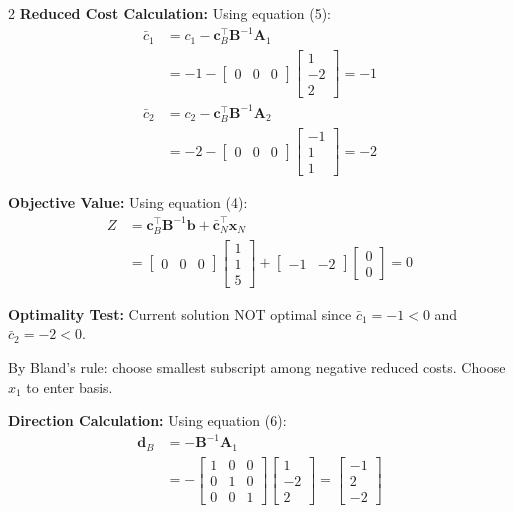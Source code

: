 \documentclass[10pt,a4paper]{article}
\newcommand{\mysubsection}[1]{\vspace{2pt}\textbf{#1:}\vspace{1pt}}
\newcommand{\mb}[1]{\mathbf{#1}}
\begin{document}
\begin{multicols}{2}
\mysubsection{Reduced Cost Calculation}
Using equation (5):
\begin{align*}
\bar{c}_1 &= c_1 - \mb{c}_B^\top\mb{B}^{-1}\mb{A}_1 \\
&= -1 - \begin{bmatrix} 0 & 0 & 0 \end{bmatrix} \begin{bmatrix} 1 \\ -2 \\ 2 \end{bmatrix} = -1 \\
\bar{c}_2 &= c_2 - \mb{c}_B^\top\mb{B}^{-1}\mb{A}_2 \\
&= -2 - \begin{bmatrix} 0 & 0 & 0 \end{bmatrix} \begin{bmatrix} -1 \\ 1 \\ 1 \end{bmatrix} = -2
\end{align*}

\mysubsection{Objective Value}
Using equation (4):
\begin{align*}
Z &= \mb{c}_B^\top\mb{B}^{-1}\mb{b} + \bar{\mb{c}}_N^\top\mb{x}_N \\
&= \begin{bmatrix} 0 & 0 & 0 \end{bmatrix} \begin{bmatrix} 1 \\ 1 \\ 5 \end{bmatrix} + \begin{bmatrix} -1 & -2 \end{bmatrix} \begin{bmatrix} 0 \\ 0 \end{bmatrix} = 0
\end{align*}

\mysubsection{Optimality Test}
Current solution NOT optimal since $\bar{c}_1 = -1 < 0$ and $\bar{c}_2 = -2 < 0$.

By Bland's rule: choose smallest subscript among negative reduced costs. Choose $x_1$ to enter basis.

\mysubsection{Direction Calculation}
Using equation (6):
\begin{align*}
\mb{d}_B &= -\mb{B}^{-1}\mb{A}_1 \\
&= -\begin{bmatrix} 1 & 0 & 0 \\ 0 & 1 & 0 \\ 0 & 0 & 1 \end{bmatrix} \begin{bmatrix} 1 \\ -2 \\ 2 \end{bmatrix} = \begin{bmatrix} -1 \\ 2 \\ -2 \end{bmatrix}
\end{align*}


\end{multicols}
\end{document}
